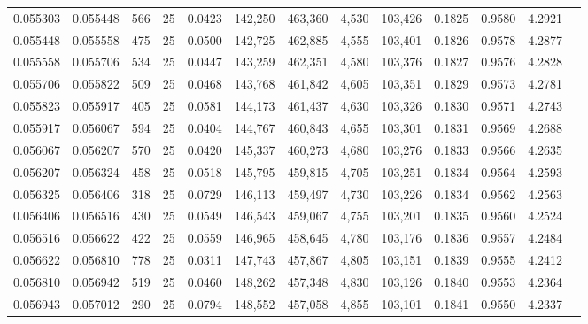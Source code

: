 \begin{tabular}{rrrrrrrrrrrrr}
0.055303 & 0.055448 &   566 &  25 &                                     0.0423 & 142,250 & 463,360 &   4,530 & 103,426 & 0.1825 & 0.9580 & 4.2921 \\
0.055448 & 0.055558 &   475 &  25 &                                     0.0500 & 142,725 & 462,885 &   4,555 & 103,401 & 0.1826 & 0.9578 & 4.2877 \\
0.055558 & 0.055706 &   534 &  25 &                                     0.0447 & 143,259 & 462,351 &   4,580 & 103,376 & 0.1827 & 0.9576 & 4.2828 \\
0.055706 & 0.055822 &   509 &  25 &                                     0.0468 & 143,768 & 461,842 &   4,605 & 103,351 & 0.1829 & 0.9573 & 4.2781 \\
0.055823 & 0.055917 &   405 &  25 &                                     0.0581 & 144,173 & 461,437 &   4,630 & 103,326 & 0.1830 & 0.9571 & 4.2743 \\
0.055917 & 0.056067 &   594 &  25 &                                     0.0404 & 144,767 & 460,843 &   4,655 & 103,301 & 0.1831 & 0.9569 & 4.2688 \\
0.056067 & 0.056207 &   570 &  25 &                                     0.0420 & 145,337 & 460,273 &   4,680 & 103,276 & 0.1833 & 0.9566 & 4.2635 \\
0.056207 & 0.056324 &   458 &  25 &                                     0.0518 & 145,795 & 459,815 &   4,705 & 103,251 & 0.1834 & 0.9564 & 4.2593 \\
0.056325 & 0.056406 &   318 &  25 &                                     0.0729 & 146,113 & 459,497 &   4,730 & 103,226 & 0.1834 & 0.9562 & 4.2563 \\
0.056406 & 0.056516 &   430 &  25 &                                     0.0549 & 146,543 & 459,067 &   4,755 & 103,201 & 0.1835 & 0.9560 & 4.2524 \\
0.056516 & 0.056622 &   422 &  25 &                                     0.0559 & 146,965 & 458,645 &   4,780 & 103,176 & 0.1836 & 0.9557 & 4.2484 \\
0.056622 & 0.056810 &   778 &  25 &                                     0.0311 & 147,743 & 457,867 &   4,805 & 103,151 & 0.1839 & 0.9555 & 4.2412 \\
0.056810 & 0.056942 &   519 &  25 &                                     0.0460 & 148,262 & 457,348 &   4,830 & 103,126 & 0.1840 & 0.9553 & 4.2364 \\
0.056943 & 0.057012 &   290 &  25 &                                     0.0794 & 148,552 & 457,058 &   4,855 & 103,101 & 0.1841 & 0.9550 & 4.2337 \\

\end{tabular}
